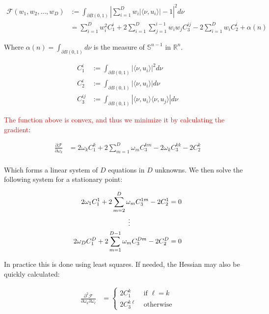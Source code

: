 \documentclass[12pt]{article}
\begin{document}
\begin{align}
\mathcal{F}(w_1,w_2,...,w_D) &:= \int_{\partial B(0,1)} \left|\sum_{i=1}^D w_i |\langle \nu, u_i \rangle| - 1 \right|^2d\nu\\
&= \sum_{i=1}^D w_i^2C_1^i + 2 \sum_{i=1}^D \sum_{j=1}^{i-1} w_i w_j C_3^{ij} - 2 \sum_{i=1}^D w_i C_2^i + \alpha(n)
\end{align}

Where $\alpha(n) = \int_{\partial B(0,1)}d\nu$ is the measure of $\mathbb{S}^{n-1}$ in $\mathbb{R}^n$. 

\begin{align*}
C_1^i &:= \int_{\partial B(0,1)} |\langle \nu,u_i \rangle|^2 d\nu\\
C_2^i &:= \int_{\partial B(0,1)} |\langle \nu,u_i \rangle| d\nu\\
C_3^{ij} &:= \int_{\partial B(0,1)} |\langle \nu,u_i \rangle \langle \nu, u_j \rangle| d\nu
\end{align*}

\textcolor{red}{The function above is convex, and thus we minimize it by calculating the gradient}:

\begin{align*}
	\frac{\partial \mathcal{F}}{\partial \omega_k}  &= 2 \omega_k C_1^k + 2 \sum_{m=1}^{D}\omega_{m}C_{3}^{km} - 2\omega_kC_3^{kk} - 2 C_2^k\\
\end{align*}

Which forms a linear system of $D$ equations in $D$ unknowns. We then solve the following system for a stationary point:

\begin{align*}
2 \omega_1 C_1^1 + 2 \sum_{m=2}^{D}\omega_{m}C_{3}^{1m}  - 2 C_2^1 &= 0\\
\vdots \hspace{20mm} & \\
2 \omega_D C_1^D + 2 \sum_{m=1}^{D-1}\omega_{m}C_{3}^{Dm} - 2 C_2^D &= 0\\
\end{align*}

In practice this is done using least squares. If needed, the Hessian may also be quickly calculated:

\begin{align*}
\frac{\partial^2 \mathcal{F}}{\partial \omega_k \partial \omega_\ell} &= \begin{cases}
2C_1^k & \text{ if } \ell = k\\
2C_3^{k\ell} & \text{ otherwise}
\end{cases}
\end{align*}
\end{document}
